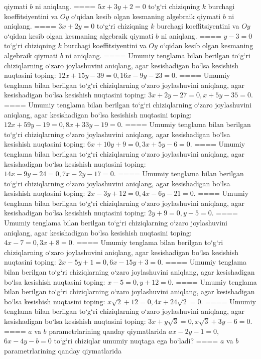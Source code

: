 qiymati $b$ ni aniqlang.
====
$5x+3y+2=0$ to‘g‘ri chiziqning $k$ burchagi
koeffitsiyentini va $Oy$ o‘qidan kesib olgan kesmaning algebraik
qiymati $b$ ni aniqlang.
====
$3x+2y=0$ to‘g‘ri chiziqning $k$ burchagi
koeffitsiyentini va $Oy$ o‘qidan kesib olgan kesmaning algebraik
qiymati $b$ ni aniqlang.
====
$y-3=0$ to‘g‘ri chiziqning $k$ burchagi
koeffitsiyentini va $Oy$ o‘qidan kesib olgan kesmaning algebraik
qiymati $b$ ni aniqlang.
====
Umumiy tenglama bilan berilgan to‘g‘ri chiziqlarning
o‘zaro joylashuvini aniqlang, agar kesishadigan bo‘lsa kesishish nuqtasini
toping: $12x+15y-39=0, 16x-9y-23=0$.
====
Umumiy tenglama bilan berilgan to‘g‘ri chiziqlarning
o‘zaro joylashuvini aniqlang, agar kesishadigan bo‘lsa kesishish nuqtasini
toping: $3x+2y-27=0, x+5y-35=0$.
====
Umumiy tenglama bilan berilgan to‘g‘ri chiziqlarning
o‘zaro joylashuvini aniqlang, agar kesishadigan bo‘lsa kesishish nuqtasini
toping: $12x+59y-19=0, 8x+33y-19=0$.
====
Umumiy tenglama bilan berilgan to‘g‘ri chiziqlarning
o‘zaro joylashuvini aniqlang, agar kesishadigan bo‘lsa kesishish nuqtasini
toping: $6x+10y+9=0, 3x+5y-6=0$.
====
Umumiy tenglama bilan berilgan to‘g‘ri chiziqlarning
o‘zaro joylashuvini aniqlang, agar kesishadigan bo‘lsa kesishish nuqtasini
toping: $14x-9y-24=0, 7x-2y-17=0$.
====
Umumiy tenglama bilan berilgan to‘g‘ri chiziqlarning
o‘zaro joylashuvini aniqlang, agar kesishadigan bo‘lsa kesishish nuqtasini
toping: $2x-3y+12=0, 4x-6y-21=0$.
====
Umumiy tenglama bilan berilgan to‘g‘ri chiziqlarning
o‘zaro joylashuvini aniqlang, agar kesishadigan bo‘lsa kesishish nuqtasini
toping: $2y+9=0, y-5=0$.
====
Umumiy tenglama bilan berilgan to‘g‘ri chiziqlarning
o‘zaro joylashuvini aniqlang, agar kesishadigan bo‘lsa kesishish nuqtasini
toping: $4x-7=0, 3x+8=0$.
====
Umumiy tenglama bilan berilgan to‘g‘ri chiziqlarning
o‘zaro joylashuvini aniqlang, agar kesishadigan bo‘lsa kesishish nuqtasini
toping: $2x-5y+1=0, 6x-15y+3=0$.
====
Umumiy tenglama bilan berilgan to‘g‘ri chiziqlarning
o‘zaro joylashuvini aniqlang, agar kesishadigan bo‘lsa kesishish nuqtasini
toping: $x-5=0, y+12=0$.
====
Umumiy tenglama bilan berilgan to‘g‘ri chiziqlarning
o‘zaro joylashuvini aniqlang, agar kesishadigan bo‘lsa kesishish nuqtasini
toping: $x\sqrt{2}+12=0, 4x+24\sqrt{2}=0$.
====
Umumiy tenglama bilan berilgan to‘g‘ri chiziqlarning
o‘zaro joylashuvini aniqlang, agar kesishadigan bo‘lsa kesishish nuqtasini
toping: $3x+y\sqrt{3}=0, x\sqrt{3}+3y-6=0$.
====
$a$ va $b$ parametrlarining qanday qiymatlarida
$ax-2y-1=0$, $6x-4y-b=0$ to‘g‘ri chiziqlar umumiy nuqtaga ega bo‘ladi?
====
$a$ va $b$ parametrlarining qanday qiymatlarida
